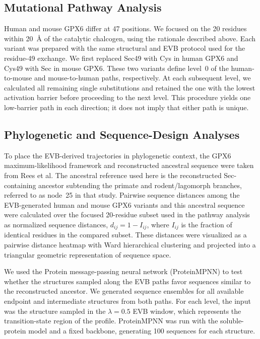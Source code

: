 \subsection{Mutational Pathway Analysis}

Human and mouse GPX6 differ at 47 positions. We focused on the 20 residues within 20~\AA{} of the catalytic chalcogen, using the rationale described above. Each variant was prepared with the same structural and EVB protocol used for the residue-49 exchange. We first replaced Sec49 with Cys in human GPX6 and Cys49 with Sec in mouse GPX6. These two variants define level~0 of the human-to-mouse and mouse-to-human paths, respectively. At each subsequent level, we calculated all remaining single substitutions and retained the one with the lowest activation barrier before proceeding to the next level. This procedure yields one low-barrier path in each direction; it does not imply that either path is unique.

\subsection{Phylogenetic and Sequence-Design Analyses}

To place the EVB-derived trajectories in phylogenetic context, the GPX6 maximum-likelihood framework and reconstructed ancestral sequence were taken from Rees et al.\cite{rees_ancient_2024} The ancestral reference used here is the reconstructed Sec-containing ancestor subtending the primate and rodent/lagomorph branches, referred to as node~25 in that study. Pairwise sequence distances among the EVB-generated human and mouse GPX6 variants and this ancestral sequence were calculated over the focused 20-residue subset used in the pathway analysis as normalized sequence distances, $d_{ij}=1-I_{ij}$, where $I_{ij}$ is the fraction of identical residues in the compared subset. These distances were visualized as a pairwise distance heatmap with Ward hierarchical clustering and projected into a triangular geometric representation of sequence space.

We used the Protein message-passing neural network (ProteinMPNN) to test whether the structures sampled along the EVB paths favor sequences similar to the reconstructed ancestor.\cite{Dauparas2022ProteinMPNN} We generated sequence ensembles for all available endpoint and intermediate structures from both paths. For each level, the input was the structure sampled in the $\lambda=0.5$ EVB window, which represents the transition-state region of the profile. ProteinMPNN was run with the soluble-protein model and a fixed backbone, generating 100 sequences for each structure.

